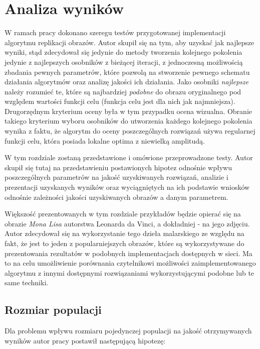 \chapter{Analiza wyników}
\thispagestyle{chapterBeginStyle}
\label{rozdzial5}

W ramach pracy dokonano szeregu testów przygotowanej implementacji algorytmu replikacji obrazów. Autor skupił się na tym, aby uzyskać jak najlepsze wyniki, stąd zdecydował się jedynie do metody tworzenia kolejnego pokolenia jedynie z najlepszych osobników z bieżącej iteracji, z jednoczesną możliwością zbadania pewnych parametrów, które pozwolą na stworzenie pewnego schematu działania algorytmów oraz analizę jakości ich działania. Jako osobniki \textit{najlepsze} należy rozumieć te, które są najbardziej \textit{podobne} do obrazu oryginalnego pod względem wartości funkcji celu (funkcja celu jest dla nich jak najmniejsza). Drugorzędnym kryterium oceny była w tym przypadku ocena wizualna. Obranie takiego kryterium wyboru osobników do utworzenia każdego kolejnego pokolenia wynika z faktu, że algorytm do oceny poszczególnych rozwiązań używa regularnej funkcji celu, która posiada lokalne optima z niewielką amplitudą.

W tym rozdziale zostaną przedstawione i omówione przeprowadzone testy. Autor skupił się tutaj na przedstawieniu postawionych hipotez odnośnie wpływu poszczególnych parametrów na jakość uzyskiwanych rozwiązań, analizie i prezentacji uzyskanych wyników oraz wyciągniętych na ich podstawie wniosków odnośnie zależności jakości uzyskiwanych obrazów a danym parametrem. 

Większość prezentowanych w tym rozdziale przykładów będzie opierać się na obrazie \textit{Mona Lisa} autorstwa Leonarda da Vinci, a dokładniej - na jego zdjęciu. Autor zdecydował się na wykorzystanie tego dzieła malarskiego ze względu na fakt, że jest to jeden z popularniejszych obrazów, które są wykorzystywane do prezentowania rezultatów w podobnych implementacjach dostępnych w sieci. Ma to na celu umożliwienie porównania czytelnikowi możliwości zaimplementowanego algorytmu z innymi dostępnymi rozwiązaniami wykorzystującymi podobne lub te same techniki.

\section{Rozmiar populacji}
\label{sec:population}
Dla problemu wpływu rozmiaru pojedynczej populacji na jakość otrzymywanych wyników autor pracy postawił następującą hipotezę:

